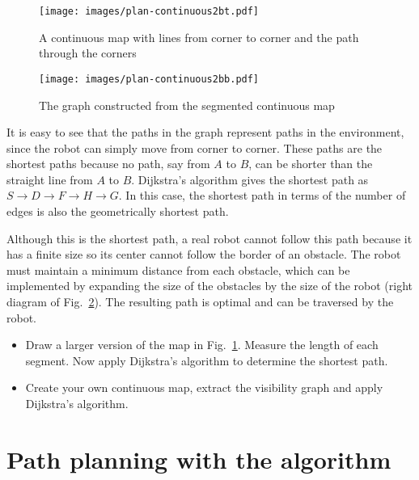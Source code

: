 \begin{figure}
\begin{center}
\texttt{[image: images/plan-continuous2bt.pdf]}
\end{center}
\caption{A continuous map with lines from corner to corner and the path through the corners}\label{fig.map-graph-bt}
\end{figure}

\begin{figure}
\begin{center}
\texttt{[image: images/plan-continuous2bb.pdf]}
\end{center}
\caption{The graph constructed from the segmented continuous map}\label{fig.map-graph-bb}
\end{figure}

It is easy to see that the paths in the graph represent paths in the environment, since the robot can simply move from corner to corner. These paths are the shortest paths because no path, say from $A$ to $B$, can be shorter than the straight line from $A$ to $B$. Dijkstra's algorithm gives the shortest path as $S\rightarrow D\rightarrow F\rightarrow H\rightarrow G$. In this case, the shortest path in terms of the number of edges is also the geometrically shortest path.

Although this is the shortest path, a real robot cannot follow this path because it has a finite size so its center cannot follow the border of an obstacle. The robot must maintain a minimum distance from each obstacle, which can be implemented by expanding the size of the obstacles by the size of the robot (right diagram of Fig.~\ref{fig.map-graph-bb}). The resulting path is optimal and can be traversed by the robot.

\begin{framed}
\begin{itemize}
\item Draw a larger version of the map in Fig.~\ref{fig.map-graph-bt}. Measure the length of each segment. Now apply Dijkstra's algorithm to determine the shortest path.
\item Create your own continuous map, extract the visibility graph and apply Dijkstra's algorithm.
\end{itemize}
\end{framed}

\section[]{Path planning with the \astar{} algorithm}\label{s.astar}

